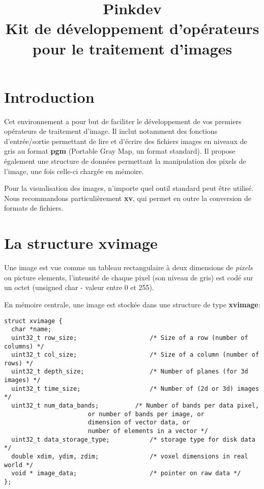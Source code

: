


\title{Pinkdev\\
Kit de d\'eveloppement d'op\'erateurs pour le traitement d'images
}

\section{Introduction}

Cet environnement a pour but de faciliter le d\'eveloppement
de vos premiers op\'erateurs de traitement d'image. Il inclut 
notamment des fonctions d'entr\'ee/sortie permettant de lire
et d'\'ecrire des fichiers images en niveaux de gris au format 
{\bf pgm} (Portable Gray Map, un format standard). Il propose \'egalement
une structure de donn\'ees permettant la manipulation des pixels
de l'image, une fois celle-ci charg\'ee en m\'emoire.

Pour la visualisation des images, n'importe quel outil standard
peut \^etre utilis\'e. Nous recommandons 
particuli\`erement {\bf xv}, qui permet en outre la conversion 
de formats de fichiers.

\section{La structure xvimage}

Une image est vue comme un tableau rectangulaire \`a deux 
dimensions de {\it pixels} ou picture elements, 
l'intensit\'e de chaque pixel (son niveau de gris) est cod\'e
sur un octet (unsigned char - valeur entre 0 et 255).

En m\'emoire centrale, une image est stock\'ee dans une structure
de type {\bf xvimage}:

\begin{verbatim}
struct xvimage {
  char *name;
  uint32_t row_size;                    /* Size of a row (number of columns) */
  uint32_t col_size;                    /* Size of a column (number of rows) */
  uint32_t depth_size;                  /* Number of planes (for 3d images) */
  uint32_t time_size;                   /* Number of (2d or 3d) images */
  uint32_t num_data_bands;	        /* Number of bands per data pixel,
					   or number of bands per image, or
					   dimension of vector data, or
					   number of elements in a vector */
  uint32_t data_storage_type;           /* storage type for disk data */
  double xdim, ydim, zdim;              /* voxel dimensions in real world */
  void * image_data;                    /* pointer on raw data */
};
\end{verbatim}

